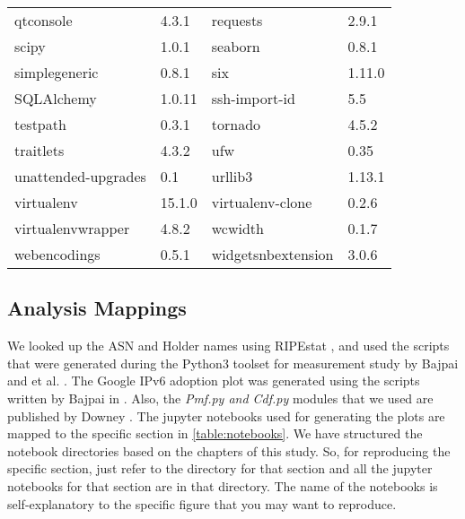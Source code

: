 \begin{table}[!h]
\begin{tabular}{||l|l|l|l||}
		qtconsole & 4.3.1 & requests & 2.9.1 \\
		scipy & 1.0.1 & seaborn & 0.8.1 \\
		simplegeneric & 0.8.1 & six & 1.11.0 \\
		SQLAlchemy & 1.0.11 & ssh-import-id & 5.5 \\
		testpath & 0.3.1 & tornado & 4.5.2 \\
		traitlets & 4.3.2 & ufw & 0.35 \\
		unattended-upgrades & 0.1 & urllib3 & 1.13.1 \\
		virtualenv & 15.1.0 & virtualenv-clone & 0.2.6 \\
		virtualenvwrapper & 4.8.2 & wcwidth & 0.1.7 \\
		webencodings & 0.5.1 & widgetsnbextension & 3.0.6 \\
  		\bottomrule
\end{tabular}
\end{table}

\FloatBarrier

\subsection*{Analysis Mappings}

We looked up the ASN and Holder names using RIPEstat \cite{ripestat}, and used the scripts that were generated during the Python3 toolset for measurement study by Bajpai and et al. \cite{bajpairipe}.
The Google IPv6 adoption plot was generated using the scripts written by Bajpai in \cite{bajpaiyoutube}. Also, the \textit{Pmf.py and Cdf.py} modules that we used are published by Downey \cite{downey}.
The jupyter notebooks used for generating the plots are mapped to the specific section in \cref{table:notebooks}. We have structured the notebook directories based on the chapters of this study.
So, for reproducing the specific section, just refer to the directory for that section and all the jupyter notebooks for that section are in that directory. The name of the notebooks is self-explanatory to the specific figure that you may want to reproduce.

